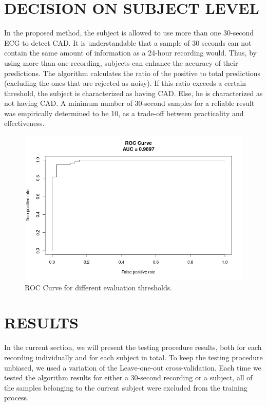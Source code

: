 \section{DECISION ON SUBJECT LEVEL}
\label{sec:subject_evaluation}
In the proposed method, the subject is allowed to use more than one 30-second ECG to detect CAD. It is understandable that a sample of 30 seconds can not contain the same amount of information as a 24-hour recording would. Thus, by using more than one recording, subjects can enhance the accuracy of their predictions. The algorithm calculates the ratio of the positive to total predictions (excluding the ones that are rejected as noisy). If this ratio exceeds a certain threshold, the subject is characterized as having CAD. Else, he is characterized as not having CAD. A minimum number of 30-second samples for a reliable result was empirically determined to be 10, as a trade-off between practicality and effectiveness.
%
\begin{figure}[t!]
    \centering
    \includegraphics[scale=0.38]{roc_black_white.png}
    \caption{ROC Curve for different evaluation thresholds.}
    \label{fig:roc}
\end{figure}
%
%
\section{RESULTS}
\label{sec:results}
In the current section, we will present the testing procedure results, both for each recording individually and for each subject in total. To keep the testing procedure unbiased, we used a variation of the Leave-one-out cross-validation. Each time we tested the algorithm results for either a 30-second recording or a subject, all of the samples belonging to the current subject were excluded from the training process.

